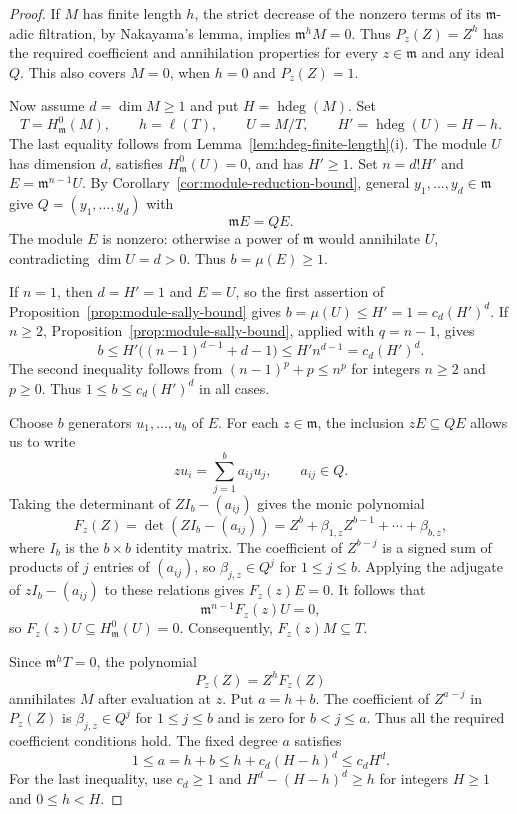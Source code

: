 \documentclass[11pt,reqno]{amsart}
\numberwithin{equation}{section}
\theoremstyle{definition}
\newcommand{\m}{\mathfrak m}
\newcommand{\hdeg}{\operatorname{hdeg}}
\begin{document}
\begin{proof}
If $M$ has finite length $h$, the strict decrease of the nonzero terms
of its $\m$-adic filtration, by Nakayama's lemma, implies $\m^hM=0$.
Thus $P_z(Z)=Z^h$ has the required coefficient and annihilation
properties for every $z\in\m$ and any ideal $Q$.
This also covers $M=0$, when $h=0$ and $P_z(Z)=1$.

Now assume $d=\dim M\geq1$ and put $H=\hdeg(M)$. Set
\[
 T=H^0_{\m}(M),\qquad h=\ell(T),\qquad U=M/T,
 \qquad H'=\hdeg(U)=H-h.
\]
The last equality follows from
Lemma~\ref{lem:hdeg-finite-length}\textup{(i)}. The module $U$ has
dimension $d$, satisfies $H^0_{\m}(U)=0$, and has $H'\geq1$.
Set $n=d!H'$ and $E=\m^{n-1}U$.
By Corollary~\ref{cor:module-reduction-bound}, general
$y_1,\ldots,y_d\in\m$ give $Q=(y_1,\ldots,y_d)$ with
\[
 \m E=QE.
\]
The module $E$ is nonzero: otherwise a power of $\m$ would
annihilate $U$, contradicting $\dim U=d>0$. Thus $b=\mu(E)\geq1$.

If $n=1$, then $d=H'=1$ and $E=U$, so the first assertion of
Proposition~\ref{prop:module-sally-bound} gives
$b=\mu(U)\leq H'=1=c_d(H')^d$.
If $n\geq2$, Proposition~\ref{prop:module-sally-bound}, applied
with $q=n-1$, gives
\[
 b\leq H'\bigl((n-1)^{d-1}+d-1\bigr)
 \leq H'n^{d-1}=c_d(H')^d.
\]
The second inequality follows from $(n-1)^p+p\leq n^p$ for
integers $n\geq2$ and $p\geq0$. Thus $1\leq b\leq c_d(H')^d$
in all cases.

Choose $b$ generators $u_1,\ldots,u_b$ of $E$. For each
$z\in\m$, the inclusion $zE\subseteq QE$ allows us to write
\[
 zu_i=\sum_{j=1}^b a_{ij}u_j,\qquad a_{ij}\in Q.
\]
Taking the determinant of $ZI_b-(a_{ij})$ gives the monic polynomial
\[
 F_z(Z)=\det(ZI_b-(a_{ij}))
       =Z^b+\beta_{1,z}Z^{b-1}+\cdots+\beta_{b,z},
\]
where $I_b$ is the $b\times b$ identity matrix.
The coefficient of $Z^{b-j}$ is a signed sum of products of $j$
entries of $(a_{ij})$, so $\beta_{j,z}\in Q^j$ for $1\leq j\leq b$.
Applying the adjugate of $zI_b-(a_{ij})$ to these relations gives
$F_z(z)E=0$. It follows that
\[
 \m^{n-1}F_z(z)U=0,
\]
so $F_z(z)U\subseteq H^0_{\m}(U)=0$. Consequently,
$F_z(z)M\subseteq T$.

Since $\m^hT=0$, the polynomial
\[
 P_z(Z)=Z^hF_z(Z)
\]
annihilates $M$ after evaluation at $z$. Put $a=h+b$.
The coefficient of $Z^{a-j}$ in $P_z(Z)$ is
$\beta_{j,z}\in Q^j$ for $1\leq j\leq b$ and is zero for
$b<j\leq a$. Thus all the required coefficient conditions hold.
The fixed degree $a$ satisfies
\[
 1\leq a=h+b\leq h+c_d(H-h)^d\leq c_dH^d.
\]
For the last inequality, use $c_d\geq1$ and
$H^d-(H-h)^d\geq h$ for integers $H\geq1$ and $0\leq h<H$.
\end{proof}
\end{document}
